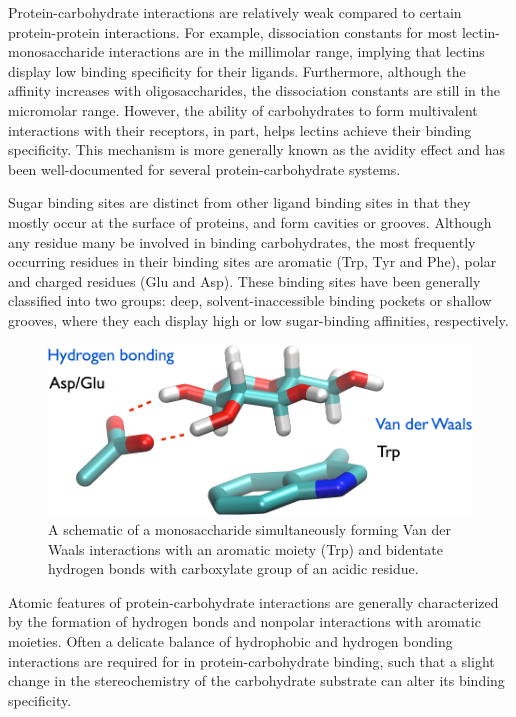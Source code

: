 Protein-carbohydrate interactions are relatively weak compared to certain protein-protein interactions. For example, dissociation constants for most lectin-monosaccharide interactions are in the millimolar range, implying that lectins display low binding specificity for their ligands. Furthermore, although the affinity increases with oligosaccharides, the dissociation constants are still in the micromolar range.  However, the ability of carbohydrates to form multivalent interactions with their receptors, in part, helps lectins achieve their binding specificity.  This mechanism is more generally known as the avidity effect and has been well-documented for several protein-carbohydrate systems.\cite{Rini:1995p2497}

Sugar binding sites are distinct from other ligand binding sites in that they mostly occur at the surface of proteins, and form cavities or grooves. Although any residue many be involved in binding carbohydrates, the most frequently occurring residues in their binding sites are aromatic (Trp, Tyr and Phe), polar and charged residues (Glu and Asp).\cite{Vyas:1991p6498} These binding sites have been generally classified into two groups: deep, solvent-inaccessible binding pockets or shallow grooves, where they each display high or low sugar-binding affinities, respectively.\cite{Vyas:1991p6498,Rini:1995p2497}

\begin{figure}
 \centering
 \includegraphics[width=5in]{figures/introduction/sugar_protein_schematic.pdf}
 \caption[A schematic of monosaccharide-protein binding mode]{A schematic of a monosaccharide simultaneously forming Van der Waals interactions with an aromatic moiety (Trp) and bidentate hydrogen bonds with carboxylate group of an acidic residue.}
 \label{fig:sugar_protein_schematic}
\end{figure}

Atomic features of protein-carbohydrate interactions are generally characterized by the formation of hydrogen bonds and nonpolar interactions with aromatic moieties.\cite{Vyas:1991p6498} Often a delicate balance of hydrophobic and hydrogen bonding interactions are required for in protein-carbohydrate binding, such that a slight change in the stereochemistry of the carbohydrate substrate can alter its binding specificity.\cite{Munske:1984ug} %

